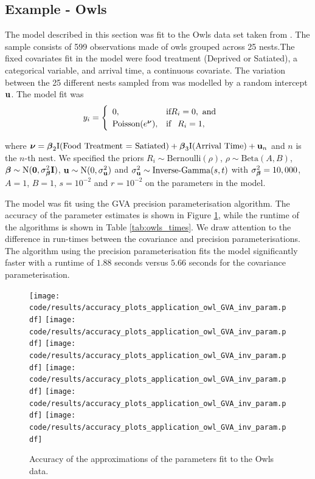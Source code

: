 \subsection{Example - Owls}
\label{sec:owls}

The model described in this section was fit to the Owls data set taken from
\cite{zuur_mixed_2009}.  The sample consists of 599 observations made of owls
grouped across 25 nests.The fixed covariates fit in the model were food
treatment (Deprived or Satiated), a categorical variable, and arrival time, a
continuous covariate.  The variation between the 25 different nests sampled
from was modelled by a random intercept ${\bf u}$. The model fit was
\begin{equation*}
	y_i = \begin{cases}
	\begin{array}{ll}
	0, & \text{if} R_i = 0, \text{ and } \\
	\text{Poisson}(e^{\boldsymbol \nu}), & \text{if} \phantom{-} R_i = 1,
	\end{array}
	\end{cases}
\end{equation*}

\noindent where ${\boldsymbol \nu} = {{\boldsymbol \beta}_2 \text{I}(\text{Food Treatment = Satiated}) +
{\boldsymbol \beta}_3 \text{I}(\text{Arrival Time}) + {\bf u}_n}$ and $n$ is the $n$-th nest.  We
specified the priors $R_i \sim \text{Bernoulli}(\rho)$, $\rho \sim
\text{Beta}(A, B)$, ${\boldsymbol \beta} \sim \text{N}({\bf 0}, \sigma_{{\boldsymbol \beta}}^2 {\bf I})$, ${\bf u}
\sim \text{N}(0, \sigma_{{\bf u}}^2)$ and $\sigma_{\bf u}^2 \sim
\text{Inverse-Gamma}(s, t)$ with $\sigma_{\boldsymbol \beta}^2=10,000$, $A=1$, $B=1$,
$s=10^{-2}$ and $r=10^{-2}$ on the parameters in the model.

The model was fit using the GVA precision parameterisation algorithm. The
accuracy of the parameter estimates is shown in Figure \ref{fig:owls}, while
the runtime of the algorithms is shown in Table \ref{tab:owls_times}. We draw
attention to the difference in run-times between the covariance and precision
parameterisations. The algorithm using the precision parameterisation fits the
model significantly faster with a runtime of $1.88$ seconds versus $5.66$
seconds for the covariance parameterisation.

\begin{figure}[h]
	\centering
	\texttt{[image: code/results/accuracy\_plots\_application\_owl\_GVA\_inv\_param.pdf]}
	\texttt{[image: code/results/accuracy\_plots\_application\_owl\_GVA\_inv\_param.pdf]}
	\texttt{[image: code/results/accuracy\_plots\_application\_owl\_GVA\_inv\_param.pdf]}
	\texttt{[image: code/results/accuracy\_plots\_application\_owl\_GVA\_inv\_param.pdf]}
	\texttt{[image: code/results/accuracy\_plots\_application\_owl\_GVA\_inv\_param.pdf]}
	\texttt{[image: code/results/accuracy\_plots\_application\_owl\_GVA\_inv\_param.pdf]}
	\caption{Accuracy of the approximations of the parameters fit to the Owls data.}
	\label{fig:owls}
\end{figure}

